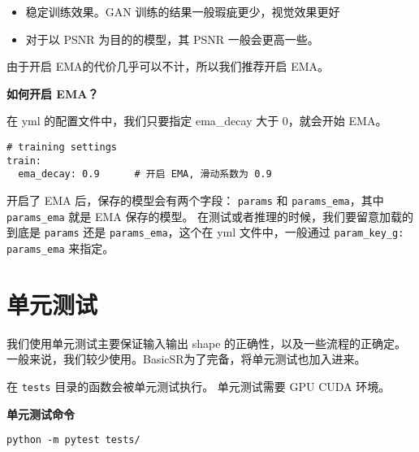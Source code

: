 \documentclass[../main.tex]{subfiles}
\begin{document}
\begin{itemize}
	\item 稳定训练效果。GAN 训练的结果一般瑕疵更少，视觉效果更好
	\item 对于以 PSNR 为目的的模型，其 PSNR 一般会更高一些。
\end{itemize}

由于开启 EMA的代价几乎可以不计，所以我们推荐开启 EMA。

\begin{hl} %
	\textbf{如何开启 EMA？}
	
	在 yml 的配置文件中，我们只要指定 ema\_decay 大于 0，就会开始 EMA。
	
	
\begin{verbatim}
# training settings
train:
  ema_decay: 0.9      # 开启 EMA, 滑动系数为 0.9
\end{verbatim}
\end{hl}

开启了 EMA 后，保存的模型会有两个字段： \texttt{params} 和 \texttt{params\_ema}，其中  \texttt{params\_ema} 就是 EMA 保存的模型。
在测试或者推理的时候，我们要留意加载的到底是 \texttt{params} 还是 \texttt{params\_ema}，这个在 yml 文件中，一般通过  \texttt{param\_key\_g: params\_ema} 来指定。


\section{单元测试}

我们使用单元测试主要保证输入输出 shape 的正确性，以及一些流程的正确定。
一般来说，我们较少使用。BasicSR为了完备，将单元测试也加入进来。

在 \texttt{tests} 目录的函数会被单元测试执行。
单元测试需要 GPU CUDA 环境。


\begin{hl} %
	\textbf{单元测试命令}
	
	
	\begin{verbatim}
python -m pytest tests/
	\end{verbatim}
\end{hl}
\end{document}
